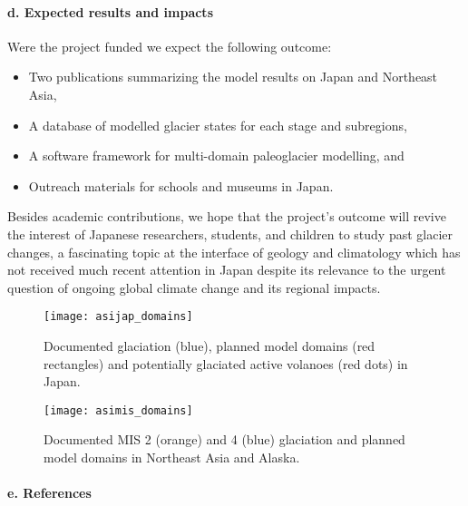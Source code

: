 \documentclass{article}
\begin{document}
\paragraph{d. Expected results and impacts}

    Were the project funded we expect the following outcome:

    \begin{itemize}
      \item{Two publications summarizing the model results on Japan and
            Northeast Asia,}
      \item{A database of modelled glacier states for each stage and
            subregions,}
      \item{A software framework for multi-domain paleoglacier modelling, and}
      \item{Outreach materials for schools and museums in Japan.}
    \end{itemize}

    Besides academic contributions, we hope that the project's outcome will
    revive the interest of Japanese researchers, students, and children to
    study past glacier changes, a fascinating topic at the interface of geology
    and climatology which has not received much recent attention in Japan
    despite its relevance to the urgent question of ongoing global climate
    change and its regional impacts.

    \begin{figure}
      \centerline{\texttt{[image: asijap\_domains]}}
      \caption{%
        Documented glaciation (blue), planned model domains (red rectangles)
        and potentially glaciated active volanoes (red dots) in Japan.}
      \label{fig:japan}
    \end{figure}

    \begin{figure}
      \centerline{\texttt{[image: asimis\_domains]}}
      \caption{%
        Documented MIS 2 (orange) and 4 (blue) glaciation and planned model
        domains in Northeast Asia and Alaska.}
      \label{fig:asia}
    \end{figure}

\paragraph{e. References}
\end{document}
